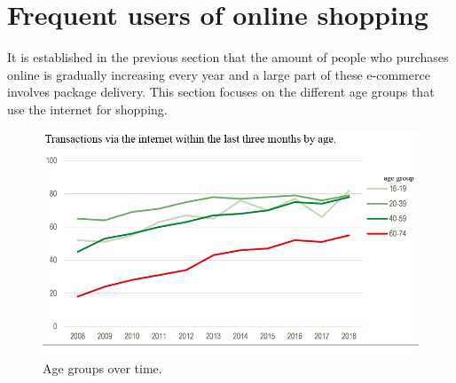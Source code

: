 \documentclass[12pt]{report}
\begin{document}
\section{Frequent users of online shopping}
It is established in the previous section that the amount of people who purchases online is gradually increasing every year and a large part of these e-commerce involves package delivery. This section focuses on the different age groups that use the internet for shopping.

\begin{figure}[H]
  \includegraphics[width=\linewidth]{pics/customer.png}
  \caption{Age groups over time. \cite{danmarkstat2}}
  \label{fig:Agegroupsovertime}
\end{figure}
\end{document}
